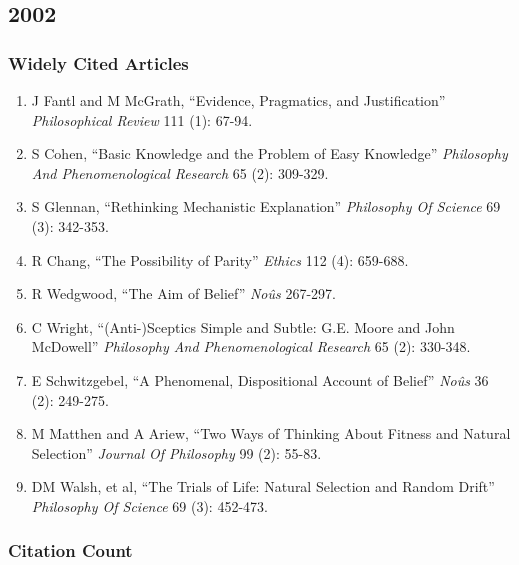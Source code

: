 \documentclass[
  10pt,
  letterpaper,
  DIV=11,
  numbers=noendperiod,
  twoside]{scrartcl}
\providecommand{\tightlist}{%
  \setlength{\itemsep}{0pt}\setlength{\parskip}{0pt}}\usepackage{longtable,booktabs,array}
\begin{document}
\newpage

\subsection{2002}\label{section-26}

\subsubsection*{Widely Cited Articles}\label{widely-cited-articles-26}

\begin{enumerate}
\def\labelenumi{\arabic{enumi}.}
\tightlist
\item
  J Fantl and M McGrath, ``Evidence, Pragmatics, and Justification''
  \emph{Philosophical Review} 111 (1): 67-94.
\item
  S Cohen, ``Basic Knowledge and the Problem of Easy Knowledge''
  \emph{Philosophy And Phenomenological Research} 65 (2): 309-329.
\item
  S Glennan, ``Rethinking Mechanistic Explanation'' \emph{Philosophy Of
  Science} 69 (3): 342-353.
\item
  R Chang, ``The Possibility of Parity'' \emph{Ethics} 112 (4): 659-688.
\item
  R Wedgwood, ``The Aim of Belief'' \emph{Noûs} 267-297.
\item
  C Wright, ``(Anti-)Sceptics Simple and Subtle: G.E. Moore and John
  McDowell'' \emph{Philosophy And Phenomenological Research} 65 (2):
  330-348.
\item
  E Schwitzgebel, ``A Phenomenal, Dispositional Account of Belief''
  \emph{Noûs} 36 (2): 249-275.
\item
  M Matthen and A Ariew, ``Two Ways of Thinking About Fitness and
  Natural Selection'' \emph{Journal Of Philosophy} 99 (2): 55-83.
\item
  DM Walsh, et al, ``The Trials of Life: Natural Selection and Random
  Drift'' \emph{Philosophy Of Science} 69 (3): 452-473.
\end{enumerate}

\subsubsection*{Citation Count}\label{citation-count-26}
\end{document}
